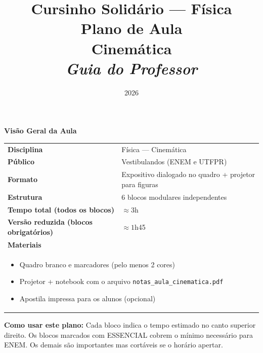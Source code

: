 \documentclass[12pt,a4paper]{article}
\title{
  \textbf{\large Cursinho Solid\'ario --- F\'isica}\\[0.5em]
  \textbf{\Huge Plano de Aula}\\[0.3em]
  \textbf{\Large Cinem\'atica}\\[0.5em]
  \normalsize \textit{Guia do Professor}
}
\author{}
\date{2026}
\begin{document}

\maketitle
\thispagestyle{empty}

\begin{tcolorbox}[
  colback=cinzafundo, colframe=azulphysics!50,
  arc=3mm, left=8pt, right=8pt, top=8pt, bottom=8pt
]
\begin{center}
  \textbf{\large Vis\~ao Geral da Aula}
\end{center}

\renewcommand{\arraystretch}{1.4}
\begin{tabularx}{\linewidth}{lX}
  \toprule
  \textbf{Disciplina} & F\'isica --- Cinem\'atica \\
  \textbf{P\'ublico} & Vestibulandos (ENEM e UTFPR) \\
  \textbf{Formato} & Expositivo dialogado no quadro + projetor para figuras \\
  \textbf{Estrutura} & 6 blocos modulares independentes \\
  \midrule
  \textbf{Tempo total (todos os blocos)} & $\approx 3$h \\
  \textbf{Vers\~ao reduzida (blocos obrigat\'orios)} & $\approx 1$h45 \\
  \midrule
  \multicolumn{2}{l}{\textbf{Materiais}} \\
  \multicolumn{2}{l}{%
    \begin{minipage}{\linewidth}
    \begin{itemize}[nosep, leftmargin=1.5em]
      \item Quadro branco e marcadores (pelo menos 2 cores)
      \item Projetor + notebook com o arquivo
        \texttt{notas\_aula\_cinematica.pdf}
      \item Apostila impressa para os alunos (opcional)
    \end{itemize}
    \end{minipage}
  } \\
  \bottomrule
\end{tabularx}

\medskip
\textbf{Como usar este plano:}
Cada bloco indica o tempo estimado no canto superior direito.
Os blocos marcados com \colorbox{verdeok!30}{\small ESSENCIAL} cobrem o m\'inimo
necess\'ario para ENEM. Os demais s\~ao importantes mas cortáveis se o
hor\'ario apertar.
\end{tcolorbox}
\end{document}
